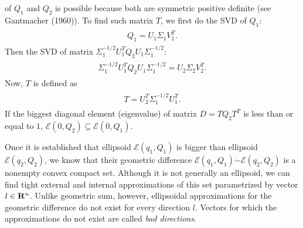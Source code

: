 \documentclass[letterpaper,10pt,english]{sphinxmanual}
\begin{document}
of $Q_1$ and $Q_2$ is possible because both are symmetric
positive definite (see Gantmacher (1960)). To find such matrix
$T$, we first do the SVD of $Q_1$:
\label{chap_ellcalc:equation-simdiag1}\begin{gather}
\begin{split}Q_1 = U_1\Sigma_1V_1^T .\end{split}\label{chap_ellcalc-simdiag1}
\end{gather}
Then the SVD of matrix
$\Sigma_1^{-1/2}U_1^TQ_2U_1\Sigma_1^{-1/2}$:
\label{chap_ellcalc:equation-simdiag2}\begin{gather}
\begin{split}\Sigma_1^{-1/2}U_1^TQ_2U_1\Sigma_1^{-1/2} = U_2\Sigma_2V_2^T.\end{split}\label{chap_ellcalc-simdiag2}
\end{gather}
Now, $T$ is defined as
\label{chap_ellcalc:equation-simdiag3}\begin{gather}
\begin{split}T = U_2^T \Sigma_1^{-1/2}U_1^T.\end{split}\label{chap_ellcalc-simdiag3}
\end{gather}
If the biggest diagonal element (eigenvalue) of matrix $D=TQ_2T^T$
is less than or equal to $1$,
${\mathcal E}(0,Q_2)\subseteq{\mathcal E}(0,Q_1)$.

Once it is established that ellipsoid ${\mathcal E}(q_1,Q_1)$ is
bigger than ellipsoid ${\mathcal E}(q_2,Q_2)$, we know that their
geometric difference
${\mathcal E}(q_1,Q_1)\dot{-}{\mathcal E}(q_2,Q_2)$ is a nonempty
convex compact set. Although it is not generally an ellipsoid, we can
find tight external and internal approximations of this set parametrized
by vector $l\in{\bf R}^n$. Unlike geometric sum, however,
ellipsoidal approximations for the geometric difference do not exist for
every direction $l$. Vectors for which the approximations do not
exist are called \emph{bad directions}.
\end{document}
